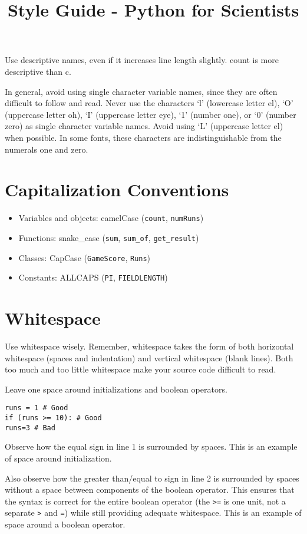 \documentclass{article}
\title{Style Guide - Python for Scientists}
\begin{document}
\maketitle

Use descriptive names, even if it increases line length slightly. count is more descriptive than c.

In general, avoid using single character variable names, since they are often difficult to follow and read. Never use the characters ‘l’ (lowercase letter el), ‘O’ (uppercase letter oh), ‘I’ (uppercase letter eye), ‘1’ (number one), or ‘0’ (number zero) as single character variable names. Avoid using ‘L’ (uppercase letter el) when possible. In some fonts, these characters are indistinguishable from the numerals one and zero.

\section*{Capitalization Conventions}
\begin{itemize}
    \item Variables and objects: camelCase (\verb|count|, \verb|numRuns|)
    \item Functions: snake\_case (\verb|sum|, \verb|sum_of|, \verb|get_result|)
    \item Classes: CapCase (\verb|GameScore|, \verb|Runs|)
    \item Constants: ALLCAPS (\verb|PI|, \verb|FIELDLENGTH|)
\end{itemize}

\section*{Whitespace}
Use whitespace wisely. Remember, whitespace takes the form of both horizontal whitespace (spaces and indentation) and vertical whitespace (blank lines). Both too much and too little whitespace make your source code difficult to read.

Leave one space around initializations and boolean operators.

\begin{lstlisting}[style=pippython]
runs = 1 # Good
if (runs >= 10): # Good
runs=3 # Bad
\end{lstlisting}

Observe how the equal sign in line 1 is surrounded by spaces. This is an example of space around initialization.

Also observe how the greater than/equal to sign in line 2 is surrounded by spaces without a space between components of the boolean operator. This ensures that the syntax is correct for the entire boolean operator (the \verb|>=| is one unit, not a separate \verb|>| and \verb|=|) while still providing adequate whitespace. This is an example of space around a boolean operator.
\end{document}
